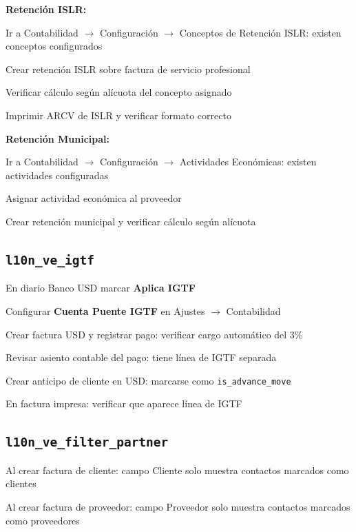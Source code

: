 \documentclass[11pt,a4paper]{article}
\newcommand{\modulo}[1]{\texttt{\textcolor{naranja}{#1}}}
\begin{document}
\begin{Form}
\textbf{Retención ISLR:}
\begin{checklist}
  \item Ir a Contabilidad $\rightarrow$ Configuración $\rightarrow$ Conceptos de Retención ISLR: existen conceptos configurados
  \item Crear retención ISLR sobre factura de servicio profesional
  \item Verificar cálculo según alícuota del concepto asignado
  \item Imprimir ARCV de ISLR y verificar formato correcto
\end{checklist}

\textbf{Retención Municipal:}
\begin{checklist}
  \item Ir a Contabilidad $\rightarrow$ Configuración $\rightarrow$ Actividades Económicas: existen actividades configuradas
  \item Asignar actividad económica al proveedor
  \item Crear retención municipal y verificar cálculo según alícuota
\end{checklist}

\subsection{\modulo{l10n\_ve\_igtf}}

\begin{checklist}
  \item En diario Banco USD marcar \textbf{Aplica IGTF}
  \item Configurar \textbf{Cuenta Puente IGTF} en Ajustes $\rightarrow$ Contabilidad
  \item Crear factura USD y registrar pago: verificar cargo automático del 3\%
  \item Revisar asiento contable del pago: tiene línea de IGTF separada
  \item Crear anticipo de cliente en USD: marcarse como \texttt{is\_advance\_move}
  \item En factura impresa: verificar que aparece línea de IGTF
\end{checklist}

\subsection{\modulo{l10n\_ve\_filter\_partner}}

\begin{checklist}
  \item Al crear factura de cliente: campo Cliente solo muestra contactos marcados como clientes
  \item Al crear factura de proveedor: campo Proveedor solo muestra contactos marcados como proveedores
\end{checklist}


\end{Form}
\end{document}

